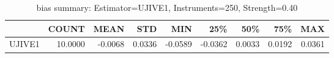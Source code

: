 \begin{table}[ht]
\centering
\caption{bias summary: Estimator=UJIVE1, Instruments=250, Strength=0.40}
\begin{tabular}{lrrrrrrrr}
\toprule
 & COUNT & MEAN & STD & MIN & 25\% & 50\% & 75\% & MAX \\
\midrule
UJIVE1 & 10.0000 & -0.0068 & 0.0336 & -0.0589 & -0.0362 & 0.0033 & 0.0192 & 0.0361 \\
\bottomrule
\end{tabular}
\end{table}
